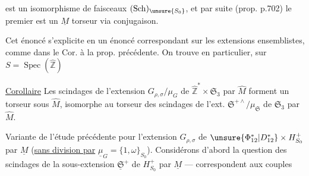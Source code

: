 

est un isomorphisme de faisceaux 
$(\mathrm{Sch})_{\unsure{S_0}}$, et par suite (prop. p.702)
le premier est un $\underline{M}$ torseur via conjugaison.

Cet énoncé s'explicite en un énoncé correspondant sur les extensions
ensemblistes, comme dans le Cor. à la prop. précédente.
On trouve en particulier, sur $S=\operatorname{Spec}(\widehat{\mathbb{Z}})$

\uline{Corollaire} Les scindages de l'extension
$G_{\rho,\sigma}/\mu_G$ de
$\widehat{\mathbb{Z}}^{*}\times\mathfrak{S}_3$ par $\widehat{M}$
forment un torseur sous $\widehat{M}$, isomorphe
 au torseur des scindages de l'ext.
$\mathfrak{S}^{+\wedge}/\mu_{\mathfrak{S}}$  de
$\mathfrak{S}_3$ par $\widehat{M}$.


Variante de l'étude précédente pour l'extension $G_{\rho,\sigma}$ de
$\unsure{\Phi_{12}^{*}|D_{12}^{*}}\times H_{S_0}^{+}$ par
$\underline{M}$ (\uline{sans division par}
$\underline{\mu}_G=\{1,\omega\}_{S_0}$). Considérons d'abord la question des
scindages de la sous-extension $\underline{\mathfrak{S}}^{+}$ de
$H_{S_0}^{+}$ par $\underline{M}$ --- 
correspondent aux couples

